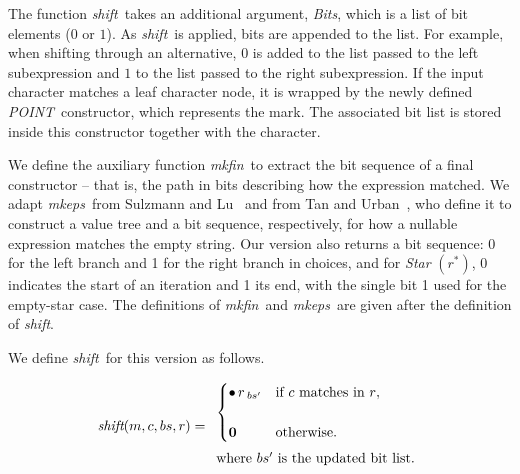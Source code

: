 \documentclass[12pt]{article}
\newcommand{\ZERO}{\textbf{0}}
\newcommand{\shift}{\textit{shift}}
\newcommand{\mkeps}{\textit{mkeps}}
\newcommand{\Marked}[1]{\bullet\,#1}
\newcommand{\Bits}{\textit{Bits}}
\newcommand{\POINT}{\textit{POINT}}
\newcommand{\mkfin}{\textit{mkfin}}
\newcommand{\STARText}{\textit{Star} $(r^*)$}
\begin{document}
The function \shift\ takes an additional argument, \Bits, which is a list of bit elements ($0$ or $1$).  
As \shift\ is applied, bits are appended to the list.  
For example, when shifting through an alternative, $0$ is added to the list passed to the left subexpression 
and $1$ to the list passed to the right subexpression.  
If the input character matches a leaf character node, it is wrapped by the newly defined \POINT\ constructor, 
which represents the mark.  
The associated bit list is stored inside this constructor together with the character.  

We define the auxiliary function \mkfin\ to extract the bit sequence of a final constructor -- 
that is, the path in bits describing how the expression matched.  
We adapt \mkeps\ from Sulzmann and Lu~\cite{Sulzmann2014} and from Tan and Urban~\cite{TanAndUrban2023}, 
who define it to construct a value tree and a bit sequence, respectively, 
for how a nullable expression matches the empty string.  
Our version also returns a bit sequence: 0 for the left branch and 1 for the right branch in choices, 
and for \STARText, 0 indicates the start of an iteration and 1 its end, 
with the single bit 1 used for the empty-star case.  
The definitions of \mkfin\ and \mkeps\ are given after the definition of \shift.  

We define \shift\ for this version as follows. 
 

\[
\renewcommand{\arraystretch}{1.7}
\shift(m, c, bs, r) =
\begin{array}{l}
  \begin{cases}
    \Marked{r\,_{bs'}} & \text{if $c$ matches in $r$}, \\\\
    \ZERO\,        & \text{otherwise.}
  \end{cases} 
  \\ \text{where $bs'$ is the updated bit list.}
\end{array}
\renewcommand{\arraystretch}{1.0}
\]
\end{document}
